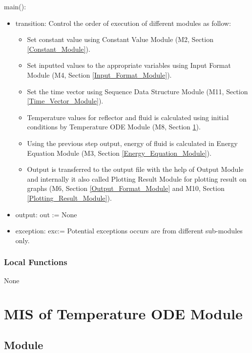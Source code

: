\documentclass[12pt, titlepage]{article}
\begin{document}
\noindent main():
\begin{itemize}
\item transition: Control the order of execution of different modules as follow: \\
\begin{itemize}
    \item Set constant value using Constant Value Module (M2, Section \ref{Constant_Module}). 
    \item Set inputted values to the appropriate variables using Input Format Module (M4, Section \ref{Input_Format_Module}). 
    \item Set the time vector using Sequence Data Structure Module (M11, Section \ref{Time_Vector_Module}).
    \item Temperature values for reflector and fluid is calculated using initial conditions by Temperature ODE Module (M8, Section \ref{Temperature_ODEs_Module}). 
    \item Using the previous step output, energy of fluid is calculated in Energy Equation Module (M3, Section \ref{Energy_Equation_Module}).
    \item Output is transferred to the output file with the help of Output Module and internally it also called Plotting Result Module for plotting result on graphs (M6, Section \ref{Output_Format_Module} and M10, Section \ref{Plotting_Result_Module}). 
     
\end{itemize}
\item output: out := None 
\item exception: exc:= Potential exceptions occurs are from different sub-modules only.   
\end{itemize}


\subsubsection{Local Functions}

None


\newpage
\section{MIS of Temperature ODE Module} \label{Temperature_ODEs_Module} 

\subsection{Module}
\end{document}
